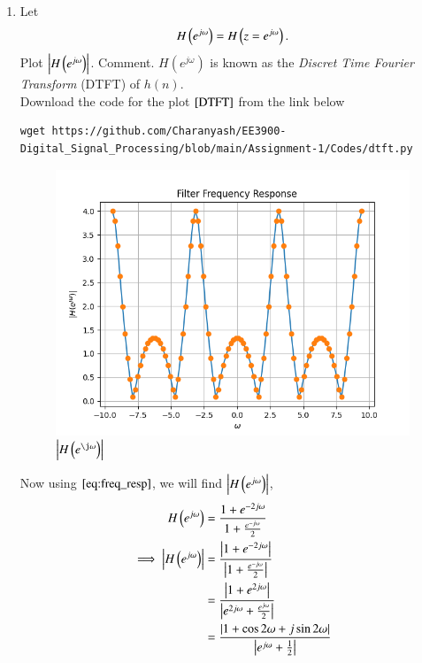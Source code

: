 \documentclass[journal,12pt,twocolumn]{IEEEtran}
\renewcommand\thesection{\arabic{section}}
\begin{document}
\begin{enumerate}[label=\thesection.\arabic*]
    \item 
      Let
      \begin{equation}
        H\left(e^{j \omega}\right) = H\left(z = e^{j \omega}\right).
      \end{equation}
      Plot $\left\vert H\left(e^{j \omega}\right)\right\vert$.  Comment.  $H(e^{j \omega})$ is known as the {\em Discret Time Fourier Transform} (DTFT) of $h(n)$.\\
    \solution
        Download the code for the plot $\ref{DTFT}$ from the link below
      \begin{lstlisting}
wget https://github.com/Charanyash/EE3900-Digital_Signal_Processing/blob/main/Assignment-1/Codes/dtft.py
      \end{lstlisting}
      \begin{figure}[ht!]
        \centering
        \includegraphics[width = \columnwidth]{Figs/dtft.png}
        \caption{$\abs{H\brak{e^{\j\omega}}}$}
        \label{DTFT}
      \end{figure} 
    Now using $\eqref{eq:freq_resp}$, we will find $\left\vert H\left(e^{j \omega}\right)\right\vert$,
     \begin{align}
      H\brak{e^{j \omega}} &= \frac{1+e^{-2j\omega}}{1 + \frac{e^{-j\omega}}{2}}\\
        \implies \abs{H\brak{e^{j \omega}}} &= \frac{\abs{1+e^{-2j\omega}}}{\abs{1 + \frac{e^{-j\omega}}{2}}}\\
                            &= \frac{\abs{1+e^{2j\omega}}}{\abs{e^{2j\omega} + \frac{e^{j\omega}}{2}}}\\
                            &= \frac{\abs{1+\cos2\omega + j\sin2\omega}}{\abs{e^{j\omega}+ \frac{1}{2}}}\\

\end{align}
\end{enumerate}
\end{document}
